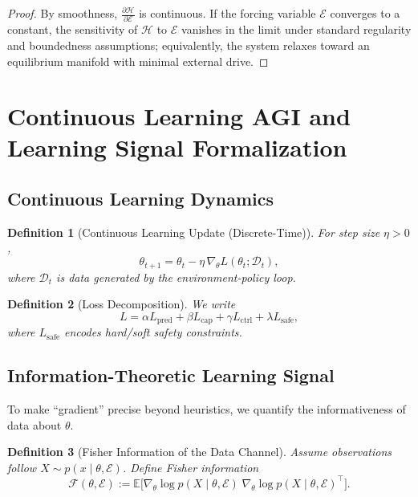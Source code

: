 \documentclass[11pt]{article}
\newtheorem{definition}{Definition}
\newcommand{\Eenv}{\mathcal{E}}     %
\newcommand{\Hsys}{\mathcal{H}}     %
\begin{document}
\begin{proof}
By smoothness, $\frac{\partial \Hsys}{\partial \Eenv}$ is continuous. If the forcing variable $\Eenv$ converges to a constant, the sensitivity of $\Hsys$ to $\Eenv$ vanishes in the limit under standard regularity and boundedness assumptions; equivalently, the system relaxes toward an equilibrium manifold with minimal external drive.
\end{proof}

\section{Continuous Learning AGI and Learning Signal Formalization}

\subsection{Continuous Learning Dynamics}

\begin{definition}[Continuous Learning Update (Discrete-Time)]
For step size $\eta>0$,
\[
\theta_{t+1}=\theta_t-\eta\,\nabla_{\theta} L(\theta_t;\mathcal{D}_t),
\]
where $\mathcal{D}_t$ is data generated by the environment-policy loop.
\end{definition}

\begin{definition}[Loss Decomposition]
We write
\[
L = \alpha L_{\mathrm{pred}} + \beta L_{\mathrm{cap}} + \gamma L_{\mathrm{ctrl}} + \lambda L_{\mathrm{safe}},
\]
where $L_{\mathrm{safe}}$ encodes hard/soft safety constraints.
\end{definition}

\subsection{Information-Theoretic Learning Signal}

To make ``gradient'' precise beyond heuristics, we quantify the informativeness of data about $\theta$.

\begin{definition}[Fisher Information of the Data Channel]
Assume observations follow $X\sim p(x\mid \theta,\Eenv)$.
Define Fisher information
\[
\mathcal{F}(\theta,\Eenv):=
\mathbb{E}\Big[\nabla_\theta \log p(X\mid \theta,\Eenv)\;\nabla_\theta \log p(X\mid \theta,\Eenv)^\top\Big].
\]
\end{definition}
\end{document}
